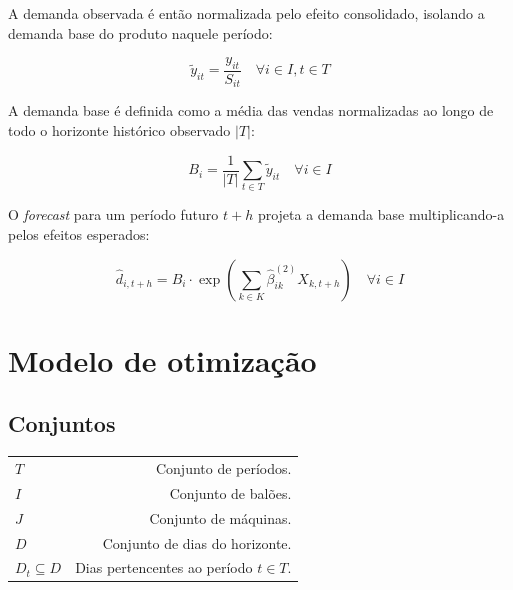 \documentclass[fleqn,12pt,a4paper]{article}
\begin{document}
A demanda observada é então normalizada pelo efeito consolidado, isolando a demanda base do produto naquele período:
\begin{ceqn}
\begin{equation}
\tilde{y}_{it} = \frac{y_{it}}{S_{it}} \quad \forall i \in I, t \in T
\label{eq:demanda_normalizada}
\end{equation}
\end{ceqn}

A demanda base é definida como a média das vendas normalizadas ao longo de todo o horizonte histórico observado $|T|$:
\begin{ceqn}
\begin{equation}
B_{i} = \frac{1}{|T|} \sum_{t \in T} \tilde{y}_{it} \quad \forall i \in I
\label{eq:demanda_base}
\end{equation}
\end{ceqn}

O \textit{forecast} para um período futuro $t+h$ projeta a demanda base multiplicando-a pelos efeitos esperados:
\begin{ceqn}
\begin{equation}
\hat{d}_{i,t+h} = B_{i} \cdot \exp \left( \sum_{k \in K} \hat{\beta}^{(2)}_{ik} X_{k,t+h} \right) \quad \forall i \in I
\label{eq:forecast_final}
\end{equation}
\end{ceqn}

\newpage

\section{Modelo de otimização}
\label{sec:modelo_otimizacao}

\subsection*{Conjuntos}
\begin{tabularx}{\linewidth}{@{}L{2.8cm}R@{}}
$T$ & Conjunto de períodos.\\
$I$ & Conjunto de balões.\\
$J$ & Conjunto de máquinas.\\
$D$ & Conjunto de dias do horizonte.\\
$D_t \subseteq D$ & Dias pertencentes ao período $t \in T$.\\
\end{tabularx}
\end{document}

